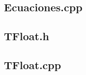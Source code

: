 \documentclass[a4paper,10pt,twoside]{article}
\begin{document}
\subsection{Ecuaciones.cpp}

\subsection{TFloat.h}

\subsection{TFloat.cpp}

%
%
\end{document}
